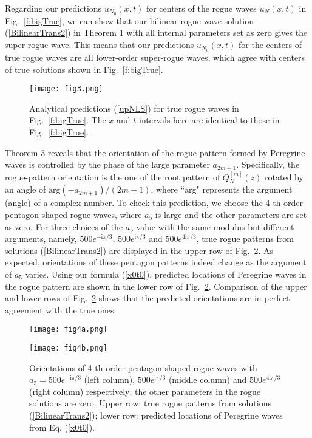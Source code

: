 \documentclass[amsmath,amssymb]{revtex4}
\begin{document}
Regarding our predictions $u_{N_{0}}(x,t)$ for centers of the rogue waves $u_N(x,t)$ in Fig.~\ref{f:bigTrue}, we can show that our bilinear rogue wave solution (\ref{BilinearTrans2}) in Theorem 1 with all internal parameters set as zero gives the super-rogue wave. This means that our predictions $u_{N_{0}}(x,t)$ for the centers of true rogue waves are all lower-order super-rogue waves, which agree with centers of true solutions shown in Fig.~\ref{f:bigTrue}.

\begin{figure}[htb]
\begin{center}
\texttt{[image: fig3.png]}
\caption{Analytical predictions (\ref{upNLS}) for true rogue waves in Fig.~\ref{f:bigTrue}. The $x$ and $t$ intervals here are identical to those in Fig.~\ref{f:bigTrue}. }  \label{f:bigPred}
\end{center}
\end{figure}

Theorem 3 reveals that the orientation of the rogue pattern formed by Peregrine waves is controlled by the phase of the large parameter $a_{2m+1}$. Specifically, the rogue-pattern orientation is the one of the root pattern of $Q_{N}^{[m]}(z)$ rotated by an angle of $\mbox{arg}(-a_{2m+1})/(2m+1)$, where ``arg" represents the argument (angle) of a complex number. To check this prediction, we choose the 4-th order pentagon-shaped rogue waves, where $a_5$ is large and the other parameters are set as zero. For three choices of the $a_5$ value with the same modulus but different arguments, namely, $500 e^{-\textrm{i} \pi/3}$, $500 e^{\textrm{i} \pi/3}$ and $500 e^{4\textrm{i} \pi/3}$, true rogue patterns from solutions (\ref{BilinearTrans2}) are displayed in the upper row of Fig.~\ref{f:orien}. As expected, orientations of these pentagon patterns indeed change as the argument of $a_5$ varies. Using our formula (\ref{x0t0}), predicted locations of Peregrine waves in the rogue pattern are shown in the lower row of Fig.~\ref{f:orien}. Comparison of the upper and lower rows of Fig.~\ref{f:orien} shows that the predicted orientations are in perfect agreement with the true ones.

\begin{figure}[htb]
\begin{center}
\texttt{[image: fig4a.png]}

\texttt{[image: fig4b.png]}
\caption{Orientations of 4-th order pentagon-shaped rogue waves with $a_5=500 e^{-\textrm{i} \pi/3}$ (left column), $500 e^{\textrm{i} \pi/3}$ (middle column) and $500 e^{4\textrm{i} \pi/3}$ (right column) respectively; the other parameters in the rogue solutions are zero. Upper row: true rogue patterns from solutions (\ref{BilinearTrans2}); lower row: predicted locations of Peregrine waves from Eq. (\ref{x0t0}). } \label{f:orien}
\end{center}
\end{figure}
\end{document}
